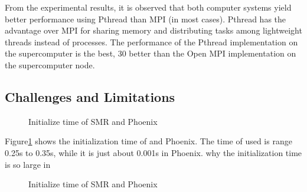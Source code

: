 From the
experimental results, it is observed that both computer systems
yield better performance using Pthread than MPI (in most
cases). Pthread has the advantage over MPI for sharing
memory and distributing tasks among lightweight threads
instead of processes. The performance of the Pthread
implementation on the supercomputer is the best, 30%
better than the Open MPI implementation on the
supercomputer node.

\subsection{ Challenges and Limitations}
\begin{figure}[htpb]
\centering
  \caption{Initialize time of SMR and Phoenix}
   \label{fig:init}
\end{figure}
Figure\ref{fig:init} shows the initialization time of \myds and Phoenix.
The time of \myds used is range 0.25s to  0.35s, 
while it is just about 0.001s in Phoenix.
{\color{red} why the initialization time is so large in \myds}

\begin{figure}[htpb]
\centering
  \caption{Initialize time of SMR and Phoenix}
   \label{fig:time}
\end{figure}
